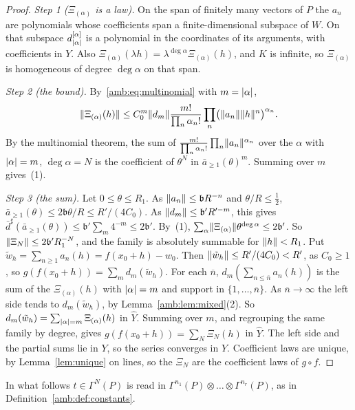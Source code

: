 \begin{proof}
\emph{Step 1 ($\Xi_{(\alpha)}$ is a law).} On the span of finitely many vectors of $P$ the $a_n$ are polynomials whose coefficients span a finite-dimensional subspace of $W$. On that subspace $d_{\lvert \alpha\rvert}^{[\alpha]}$ is a polynomial in the coordinates of its arguments, with coefficients in $Y$. Also $\Xi_{(\alpha)}(\lambda h)=\lambda^{\deg\alpha}\Xi_{(\alpha)}(h)$, and $K$ is infinite, so $\Xi_{(\alpha)}$ is homogeneous of degree $\deg\alpha$ on that span.

\emph{Step 2 (the bound).} By~\eqref{amb:eq:multinomial} with $m=\lvert \alpha\rvert$,
\[
 \lVert \Xi_{(\alpha)}(h)\rVert\le C_0^m\lVert d_m\rVert\frac{m!}{\prod_n\alpha_n!}\prod_n\bigl(\lVert a_n\rVert\lVert h\rVert^n\bigr)^{\alpha_n}.
\]
By the multinomial theorem, the sum of $\frac{m!}{\prod_n\alpha_n!}\prod_n\lVert a_n\rVert^{\alpha_n}$ over the $\alpha$ with $\lvert \alpha\rvert=m$, $\deg\alpha=N$ is the coefficient of $\theta^N$ in $\bar a_{\ge1}(\theta)^m$. Summing over $m$ gives~(1).

\emph{Step 3 (the sum).} Let $0\le\theta\le R_1$. As $\lVert a_n\rVert\le \mathfrak bR^{-n}$ and $\theta/R\le\frac12$, $\bar a_{\ge1}(\theta)\le2\mathfrak b\theta/R\le R'/(4C_0)$. As $\lVert d_m\rVert\le \mathfrak b'R'^{-m}$, this gives $\bar d^\sharp(\bar a_{\ge1}(\theta))\le \mathfrak b'\sum_m4^{-m}\le2\mathfrak b'$. By~(1), $\sum_\alpha\lVert \Xi_{(\alpha)}\rVert\theta^{\deg\alpha}\le2\mathfrak b'$. So $\lVert \Xi_N\rVert\le2\mathfrak b'R_1^{-N}$, and the family is absolutely summable for $\lVert h\rVert<R_1$. Put $\tilde w_h=\sum_{n\ge1}a_n(h)=f(x_0+h)-w_0$. Then $\lVert \tilde w_h\rVert\le R'/(4C_0)<R'$, as $C_0\ge1$, so $g(f(x_0+h))=\sum_md_m(\tilde w_h)$. For each $\overline n$, $d_m(\sum_{n\le\overline n}a_n(h))$ is the sum of the $\Xi_{(\alpha)}(h)$ with $\lvert \alpha\rvert=m$ and support in $\{1,\dots,\overline n\}$. As $\overline n\to\infty$ the left side tends to $d_m(\tilde w_h)$, by Lemma~\ref{amb:lem:mixed}(2). So $d_m(\tilde w_h)=\sum_{\lvert \alpha\rvert=m}\Xi_{(\alpha)}(h)$ in $\widehat Y$. Summing over $m$, and regrouping the same family by degree, gives $g(f(x_0+h))=\sum_N\Xi_N(h)$ in $\widehat Y$. The left side and the partial sums lie in $Y$, so the series converges in $Y$. Coefficient laws are unique, by Lemma~\ref{lem:unique} on lines, so the $\Xi_N$ are the coefficient laws of $g\circ f$.
\end{proof}

In what follows $t\in\Gamma^N(P)$ is read in $\Gamma^{n_1}(P)\otimes\dots\otimes\Gamma^{n_r}(P)$, as in Definition~\ref{amb:def:constants}.

